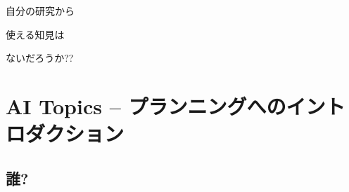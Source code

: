 \section{}
\label{sec-3}

\begin{xlarge}
自分の研究から
\begin{center}
使える知見は
\end{center}
\begin{alignright}
ないだろうか??
\end{alignright}
\end{xlarge}

\section{AI Topics -- プランニングへのイントロダクション}
\label{sec-4}
\subsection{誰?}
\label{sec-4-1}

